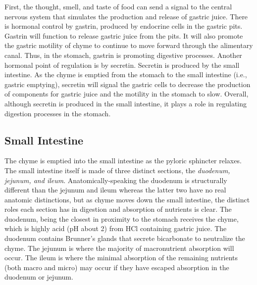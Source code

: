 \documentclass{tufte-handout}
\begin{document}
 First, the thought, smell, and taste of food can send a signal to the central nervous system that simulates the production and release of gastric juice. There is hormonal control by gastrin, produced by endocrine cells in the gastric pits. Gastrin will function to release gastric juice from the pits. It will also promote the gastric motility of chyme to continue to move forward through the alimentary canal. Thus, in the stomach, gastrin is promoting digestive processes. Another hormonal point of regulation is by secretin. Secretin is produced by the small intestine. As the chyme is emptied from the stomach to the small intestine (i.e., gastric emptying), secretin will signal the gastric cells to decrease the production of components for gastric juice and the motility in the stomach to slow. Overall, although secretin is produced in the small intestine, it plays a role in regulating digestion processes in the stomach. 

\subsection{Small Intestine}
The chyme is emptied into the small intestine as the pyloric sphincter relaxes. The small intestine itself is made of three distinct sections, the \emph{duodenum, jejunum, and ileum}. Anatomically-speaking the duodenum is structurally different than the jejunum and ileum whereas the latter two  have no real anatomic distinctions, but as chyme moves down the small intestine, the distinct roles each section has in digestion and absorption of nutrients is clear. The duodenum, being the closest in proximity to the stomach receives the chyme, which is highly acid (pH about 2) from HCl containing gastric juice. The duodenum contains Brunner's glands that secrete bicarbonate to neutralize the chyme. The jejunum is where the majority of macronutrient absorption will occur. The ileum is where the minimal absorption of the remaining nutrients (both macro and micro) may occur if they have escaped absorption in the duodenum or jejunum. 
\end{document}
